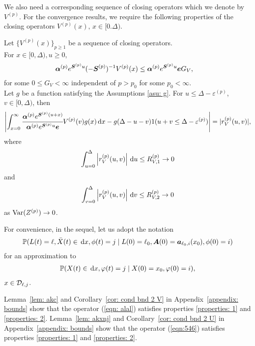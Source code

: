 We also need a corresponding sequence of closing operators which we denote by \(V^{(p)}\). For the convergence results, we require the following properties of the closing operators \(V^{(p)}(x),\, x \in[0.\Delta)\).
\begin{property}\label{properties: some props}
	Let \(\{V^{(p)}(x)\}_{p\geq 1}\) be a sequence of closing operators. \\
	\subproperty \label{properties: 1} For \(x\in[0,\Delta),u\geq 0\),  
        \begin{align*}
        		\boldsymbol \alpha^{(p)} e^{\boldsymbol S^{(p)}u}(-\boldsymbol S^{(p)})^{-1} V^{(p)}(x) &\leq \boldsymbol \alpha^{(p)} e^{\boldsymbol S^{(p)}u} \boldsymbol e G_V,
	\end{align*}
	for some \(0\leq G_V<\infty\) independent of \(p>p_0\) for some \(p_0<\infty\). \\
	\subproperty \label{properties: 2} Let \(g\) be a function satisfying the Assumptions \ref{asu: g}. For \(u\leq \Delta-\varepsilon^{(p)}\), \(v\in[0,\Delta)\), then
	\[\left|\int_{x=0}^\infty \cfrac{\boldsymbol \alpha^{(p)} e^{\boldsymbol{S}^{(p)}(u+x)} }{\boldsymbol \alpha^{(p)} e^{\boldsymbol{S}^{(p)}u} \boldsymbol e} V^{(p)}(v)g(x)\, \mathrm{d} x -g(\Delta-u-v) 1(u+v\leq\Delta-\varepsilon^{(p)})\right| =  |r_V^{(p)}(u,v)|,\]
	where 
	\[ \int_{u=0}^{\Delta}\left| r_V^{(p)}(u,v)\right| \, \mathrm{d} u  \leq R_{V,1}^{(p)} \to 0\]
	and 
	\[ \int_{v=0}^{\Delta}\left| r_V^{(p)}(u,v)\right| \, \mathrm{d} v  \leq R_{V,2}^{(p)} \to 0\]
	as \(\mathrm{Var}(Z^{(p)})\to 0\). 
\end{property}

For convenience, in the sequel, let us adopt the notation 
\begin{align}
	\mathbb P(L(t) = \ell, \bar X(t)\in\, \mathrm{d} x, \phi(t) = j\mid L(0)=\ell_0, \boldsymbol A(0) = \boldsymbol  a_{\ell_0,i}(x_0), \phi(0) = i) 
\end{align}
for an approximation to 
\begin{align}
	\mathbb P(X(t)\in\, \mathrm{d} x, \varphi(t) = j\mid X(0)=x_0, \varphi(0) = i),
\end{align}
\(x\in \mathcal{D}_{\ell,j}\).

Lemma~\ref{lem: akc} and Corollary~\ref{cor: cond bnd 2 V} in Appendix~\ref{appendix: bounds} show that the operator (\ref{eqn: alal}) satisfies properties \ref{properties: 1} and \ref{properties: 2}. Lemma~\ref{lem: akxnj} and Corollary~\ref{cor: cond bnd 2 U} in Appendix~\ref{appendix: bounds} show that the operator (\ref{eqn:546}) satisfies properties \ref{properties: 1} and \ref{properties: 2}. 

